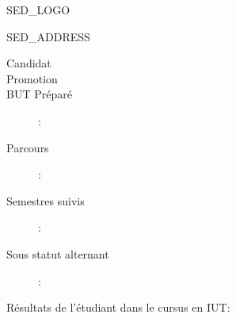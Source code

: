 \documentclass{article}
\begin{document}
\begin{minipage}[T]{0.51\textwidth}
    SED_LOGO
    \vfill
\end{minipage}%
\hfill
\vline
\hfill
\begin{minipage}[T]{0.45\textwidth}
    \raggedleft
    SED_ADDRESS
\end{minipage}

\vspace{1em}
\begin{center}
\end{center}
\vspace{0.5em}
\begin{center}
    \begin{description}
        \item[Candidat] \candidat
        \item[Promotion] \promotion
        \item[BUT Préparé]: \but
        \item[Parcours]: \parcours
        \item[Semestres suivis]: \semestres
        \item[Sous statut alternant]: \alternant
    \end{description}
\end{center}
\vspace{1em}
\noindent Résultats de l'étudiant dans le cursus en IUT:
\end{document}
